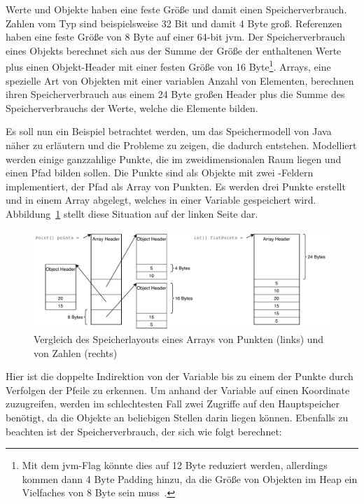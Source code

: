 Werte und Objekte haben eine feste Größe und damit einen Speicherverbrauch.
Zahlen vom Typ  sind beispielsweise 32 Bit und damit 4 Byte groß.
Referenzen haben eine feste Größe von 8 Byte auf einer 64-bit \ac{jvm}.
Der Speicherverbrauch eines Objekts berechnet sich aus der Summe der Größe der enthaltenen Werte plus einen Objekt-Header mit einer festen Größe von 16 Byte\footnote{Mit dem \ac{jvm}-Flag  könnte dies auf 12 Byte reduziert werden, allerdings kommen dann 4 Byte Padding hinzu, da die Größe von Objekten im Heap ein Vielfaches von 8 Byte sein muss~\cite{compressed-oops}.}.
Arrays, eine spezielle Art von Objekten mit einer variablen Anzahl von Elementen, berechnen ihren Speicherverbrauch aus einem 24 Byte großen Header plus die Summe des Speicherverbrauchs der Werte, welche die Elemente bilden.
~\cite{compressed-oops}

Es soll nun ein Beispiel betrachtet werden, um das Speichermodell von Java näher zu erläutern und die Probleme zu zeigen, die dadurch entstehen.
Modelliert werden einige ganzzahlige Punkte, die im zweidimensionalen Raum liegen und einen Pfad bilden sollen.
Die Punkte sind als Objekte mit zwei -Feldern implementiert, der Pfad als Array von Punkten.
Es werden drei Punkte erstellt und in einem Array abgelegt, welches in einer Variable gespeichert wird.
Abbildung~\ref{fig:memory-usage} stellt diese Situation auf der linken Seite dar.

\begin{figure}[htp]
    \centering
    \includegraphics[width=\textwidth]{img/memory-usage.pdf}
    \vspace{-3ex}
    \caption{Vergleich des Speicherlayouts eines Arrays von Punkten (links) und von Zahlen (rechts)}
    \label{fig:memory-usage}
\end{figure}

Hier ist die doppelte Indirektion von der Variable bis zu einem der Punkte durch Verfolgen der Pfeile zu erkennen.
Um anhand der Variable auf einen Koordinate zuzugreifen, werden im schlechtesten Fall zwei Zugriffe auf den Hauptspeicher benötigt, da die Objekte an beliebigen Stellen darin liegen können.
Ebenfalls zu beachten ist der Speicherverbrauch, der sich wie folgt berechnet:

